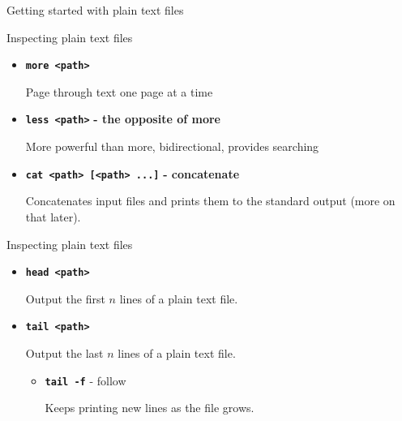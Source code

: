 \documentclass[aspectratio=1610]{beamer}
\newcommand\curtitle{}
\newcommand\command[1]{\alert{\textbf{\texttt{#1}}}}
\begin{document}

\begin{frame}[c]
    \Huge Getting started with plain text files
\end{frame}

\renewcommand\curtitle{Inspecting plain text files}

\begin{frame}[c]{\curtitle}
    \begin{itemize}[<+->]
        \setlength\itemsep{1em}
        \item \command{more <path>}

            Page through text one page at a time
        \item \command{less <path>} \textbf{- the opposite of more}

            More powerful than more, bidirectional, provides searching
        \item \command{cat <path> [<path> ...]} \textbf{- concatenate}

            Concatenates input files and prints them to the standard output (more on that later).
    \end{itemize}
\end{frame}


\begin{frame}[c]{\curtitle}
    \begin{itemize}[<+->]
        \setlength\itemsep{1em}
        \item \command{head <path>}

            Output the first $n$ lines of a plain text file.
        \item \command{tail <path>}

            Output the last $n$ lines of a plain text file.
            \begin{itemize}[<.->]
                \item \command{tail -f} - follow

                    Keeps printing new lines as the file grows.
            \end{itemize}

    \end{itemize}
\end{frame}

\end{document}
